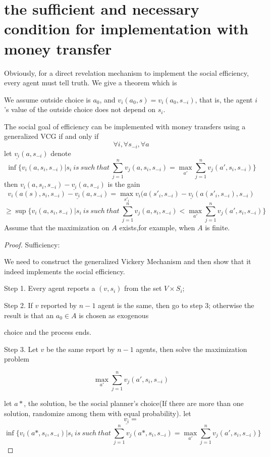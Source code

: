 \section{the sufficient and necessary condition for implementation with money transfer}
\begin{prop}


Obviously, for a direct revelation mechanism to implement the social efficiency, every agent must tell truth. 
We give a theorem which is

We assume outside choice is $a_0$, and $v_i(a_0,s)=v_i(a_0,s_{-i})$, that is, the agent $i$'s value of the outside choice does not
depend on $s_i$.
\begin{thm}
The social goal of efficiency can be implemented with money transfers using a generalized VCG 
if and only if 
$$\forall i,\forall s_{-i},\forall a $$
let $\underline{v_i}(a,s_{-i})$ denote
$$ \inf \{v_i(a,s_i, s_{-i})|s_i\ is \ such \ that\ \sum_{j=1}^n v_j(a, s_i, s_{-i}) = \max_{a'} \sum_{j=1}^n v_j(a', s_i, s_{-i}) \}$$
then $v_i(a, s_i,s_{-i})-\underline{v_i}(a,s_{-i})$ is the gain
$$v_i(a(s), s_i,s_{-i})-\underline{v_i}(a,s_{-i})=\max_{s'_i}v_i(a(s'_i,s_{-i})-\underline{v_i}(a(s'_{i},s_{-i}),s_{-i})$$
$$\geqslant \sup \{v_i(a, s_i, s_{-i})|s_i\ is \ such \ that\ \sum_{j=1}^n v_j(a, s_i, s_{-i}) < \max_{a'} \sum_{j=1}^n v_j(a', s_i, s_{-i}) \}$$
Assume that the maximization on $A$ exists,for example, when $A$ is finite. 
\end{thm}
\begin{proof}
Sufficiency:

We need to construct the generalized Vickery Mechanism and then show that it indeed implements the social efficiency.

Step 1. Every agent reports a $(v,s_i)$ from the set $V\times S_i$;

Step 2. If $v$ reported by $n-1$ agent is the same, then go to step 3; otherwise the result is that an  $a_0\in A$ is chosen as exogenous

choice and the process ends.

Step 3. Let $v$ be the same report by $n-1$ agents, then solve the maximization problem

$$\max_{a'} \sum_{j=1}^n v_j(a', s_i, s_{-i})$$


let $a*$,  the solution, be the social planner's choice(If there are more than one solution, randomize among them with equal probability).
let
$$\underline{v_i}=$$
$$ \inf \{v_i(a*,s_i, s_{-i})|s_i\ is \ such \ that\ \sum_{j=1}^n v_j(a*, s_i, s_{-i}) = \max_{a'} \sum_{j=1}^n v_j(a', s_i, s_{-i}) \}$$


\end{proof}
\end{prop}
